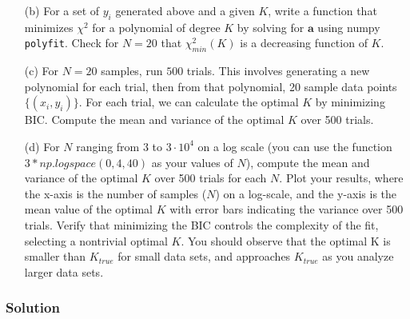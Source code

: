\documentclass[submit]{harvardml}
\begin{document}
\begin{problem}
\begin{itemize}
        \item[(b)] For a set of $y_i$ generated above and a given $K$, write a function that minimizes $\chi^2$ for a polynomial of degree $K$ by solving for $\mathbf{a}$ using
                   numpy \texttt{polyfit}.                   Check for $N=20$ that $\chi^2_{min}(K)$ is a decreasing function of $K$. 
        
        \item[(c)] For $N=20$ samples, run $500$ trials. This involves generating a new polynomial for each trial, then from that polynomial, 20 sample data points $\{(x_i,y_i)\}$. For each trial, 
                          we can calculate the optimal $K$ by minimizing BIC. Compute the mean and variance of the optimal $K$ over 500 trials.
        
        \item[(d)] For $N$ ranging from $3$ to $3 \cdot 10^4$ on a log scale (you can use the function $3*np.logspace(0,4, 40)$ as your values of $N$), 
                   compute the mean and variance of the optimal $K$ over 500 trials for each $N$. Plot your results, where the x-axis is the number of samples ($N$) on a log-scale, 
                   and the y-axis is the mean value of the optimal $K$ with error bars indicating the variance over 500 trials. Verify that minimizing the BIC controls the complexity of the fit, 
                   selecting a nontrivial optimal $K$. You should observe that the optimal K is smaller than $K_{true}$ for small data sets, and approaches $K_{true}$ as you 
                   analyze larger data sets.
        
    \end{itemize}


\end{problem}

\newpage
\subsubsection*{Solution}
\end{document}

